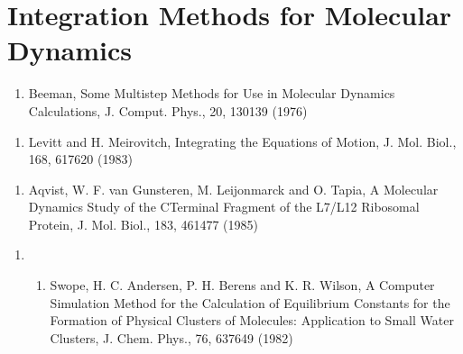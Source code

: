 \documentclass[letterpaper,11pt,english]{sphinxmanual}
\begin{document}
\section{Integration Methods for Molecular Dynamics}
\label{\detokenize{text/references:integration-methods-for-molecular-dynamics}}\begin{enumerate}
%
\setcounter{enumi}{3}
\item {} 
Beeman, Some Multistep Methods for Use in Molecular Dynamics Calculations, J. Comput. Phys., 20, 130\sphinxhyphen{}139 (1976)

\end{enumerate}
\begin{enumerate}
%
\setcounter{enumi}{12}
\item {} 
Levitt and H. Meirovitch, Integrating the Equations of Motion, J. Mol. Biol., 168, 617\sphinxhyphen{}620 (1983)

\end{enumerate}
\begin{enumerate}
%
\setcounter{enumi}{9}
\item {} 
Aqvist, W. F. van Gunsteren, M. Leijonmarck and O. Tapia, A Molecular Dynamics Study of the C\sphinxhyphen{}Terminal Fragment of the L7/L12 Ribosomal Protein, J. Mol. Biol., 183, 461\sphinxhyphen{}477 (1985)

\end{enumerate}
\begin{enumerate}
%
\setcounter{enumi}{22}
\item {} \begin{enumerate}
%
\setcounter{enumii}{2}
\item {} 
Swope, H. C. Andersen, P. H. Berens and K. R. Wilson, A Computer Simulation Method for the Calculation of Equilibrium Constants for the Formation of Physical Clusters of Molecules: Application to Small Water Clusters, J. Chem. Phys., 76, 637\sphinxhyphen{}649 (1982)

\end{enumerate}

\end{enumerate}
\end{document}
